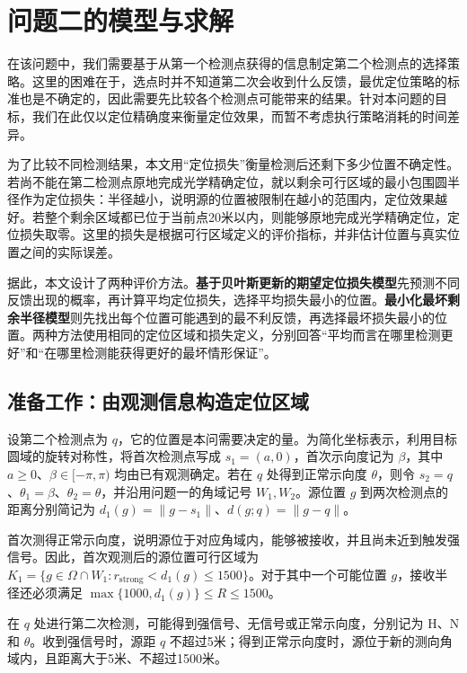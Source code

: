 \section{问题二的模型与求解}

在该问题中，我们需要基于从第一个检测点获得的信息制定第二个检测点的选择策略。这里的困难在于，选点时并不知道第二次会收到什么反馈，最优定位策略的标准也是不确定的，因此需要先比较各个检测点可能带来的结果。针对本问题的目标，我们在此仅以定位精确度来衡量定位效果，而暂不考虑执行策略消耗的时间差异。

为了比较不同检测结果，本文用“定位损失”衡量检测后还剩下多少位置不确定性。若尚不能在第二检测点原地完成光学精确定位，就以剩余可行区域的最小包围圆半径作为定位损失：半径越小，说明源的位置被限制在越小的范围内，定位效果越好。若整个剩余区域都已位于当前点20米以内，则能够原地完成光学精确定位，定位损失取零。这里的损失是根据可行区域定义的评价指标，并非估计位置与真实位置之间的实际误差。

据此，本文设计了两种评价方法。\textbf{基于贝叶斯更新的期望定位损失模型}先预测不同反馈出现的概率，再计算平均定位损失，选择平均损失最小的位置。\textbf{最小化最坏剩余半径模型}则先找出每个位置可能遇到的最不利反馈，再选择最坏损失最小的位置。两种方法使用相同的定位区域和损失定义，分别回答“平均而言在哪里检测更好”和“在哪里检测能获得更好的最坏情形保证”。

\subsection{准备工作：由观测信息构造定位区域}

设第二个检测点为 \(q\)，它的位置是本问需要决定的量。为简化坐标表示，利用目标圆域的旋转对称性，将首次检测点写成 \(s_1=(a,0)\)，首次示向度记为 \(\beta\)，其中 \(a\ge0\)、\(\beta\in[-\pi,\pi)\) 均由已有观测确定。若在 \(q\) 处得到正常示向度 \(\theta\)，则令 \(s_2=q\)、\(\theta_1=\beta\)、\(\theta_2=\theta\)，并沿用问题一的角域记号 \(W_1,W_2\)。源位置 \(g\) 到两次检测点的距离分别简记为 \(d_1(g)=\|g-s_1\|\)、\(d(g;q)=\|g-q\|\)。

首次测得正常示向度，说明源位于对应角域内，能够被接收，并且尚未近到触发强信号。因此，首次观测后的源位置可行区域为 \(K_1=\{g\in\Omega\cap W_1:r_{\mathrm{strong}}<d_1(g)\le1500\}\)。对于其中一个可能位置 \(g\)，接收半径还必须满足 \(\max\{1000,d_1(g)\}\le R\le1500\)。

在 \(q\) 处进行第二次检测，可能得到强信号、无信号或正常示向度，分别记为 \(\mathrm H\)、\(\mathrm N\) 和 \(\theta\)。收到强信号时，源距 \(q\) 不超过5米；得到正常示向度时，源位于新的测向角域内，且距离大于5米、不超过1500米。


